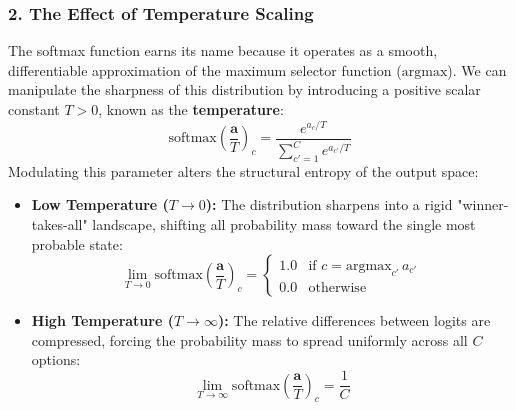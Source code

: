 \documentclass{article}
\begin{document}
\subsubsection*{2. The Effect of Temperature Scaling}
The softmax function earns its name because it operates as a smooth, differentiable approximation of the maximum selector function ($\text{argmax}$). We can manipulate the sharpness of this distribution by introducing a positive scalar constant $T > 0$, known as the \textbf{temperature}:
\begin{equation}
    \text{softmax}\left(\frac{\boldsymbol{a}}{T}\right)_c = \frac{e^{a_c / T}}{\sum_{c'=1}^{C} e^{a_{c'} / T}}
\end{equation}
Modulating this parameter alters the structural entropy of the output space:
\begin{itemize}
    \item \textbf{Low Temperature ($T \to 0$):} The distribution sharpens into a rigid "winner-takes-all" landscape, shifting all probability mass toward the single most probable state:
    \begin{equation}
        \lim_{T \to 0} \text{softmax}\left(\frac{\boldsymbol{a}}{T}\right)_c = 
        \begin{cases} 
            1.0 & \text{if } c = \text{argmax}_{c'} \, a_{c'} \\ 
            0.0 & \text{otherwise} 
        \end{cases}
    \end{equation}
    \item \textbf{High Temperature ($T \to \infty$):} The relative differences between logits are compressed, forcing the probability mass to spread uniformly across all $C$ options:
    \begin{equation}
        \lim_{T \to \infty} \text{softmax}\left(\frac{\boldsymbol{a}}{T}\right)_c = \frac{1}{C}
    \end{equation}
\end{itemize}
\end{document}
